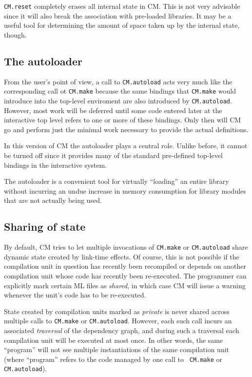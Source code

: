 \documentclass{article}
\begin{document}
{\tt CM.reset} completely erases all internal state in CM.  This is
not very advisable since it will also break the association with
pre-loaded libraries.  It may be a useful tool for determining the
amount of space taken up by the internal state, though.

\subsection{The autoloader}
\label{sec:autoload}

From the user's point of view, a call to {\tt CM.autoload} acts very
much like the corresponding call ot {\tt CM.make} because the same
bindings that {\tt CM.make} would introduce into the top-level
enviroment are also introduced by {\tt CM.autoload}.  However, most
work will be deferred until some code entered later at the interactive
top level refers to one or more of these bindings.  Only then will CM
go and perform just the minimal work necessary to provide the actual
definitions.

In this version of CM the autoloader plays a central role.  Unlike
before, it cannot be turned off since it provides many of the standard
pre-defined top-level bindings in the interactive system.

The autoloader is a convenient tool for virtually ``loading'' an
entire library without incurring an undue increase in memory
consumption for library modules that are not actually being used.

\subsection{Sharing of state}
\label{sec:sharing}

By default, CM tries to let multiple invocations of {\tt CM.make} or
{\tt CM.autoload} share dynamic state created by link-time effects.
Of course, this is not possible if the compilation unit in question
has recently been recompiled or depends on another compilation unit
whose code has recently been re-executed.  The programmer can
explicitly mark certain ML files as {\em shared}, in which case CM
will issue a warning whenever the unit's code has to be re-executed.

State created by compilation units marked as {\em private} is never
shared across multiple calls to {\tt CM.make} or {\tt CM.autoload}.
However, each such call incurs an associated {\em traversal} of the
dependency graph, and during such a traversal each compilation unit
will be executed at most once.  In other words, the same ``program''
will not see multiple instantiations of the same compilation unit
(where ``program'' refers to the code managed by one call to {\tt
CM.make} or {\tt CM.autoload}).
\end{document}
